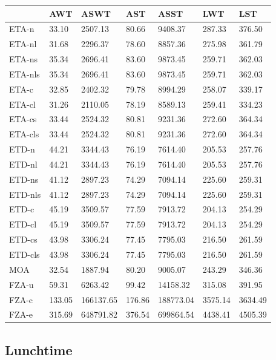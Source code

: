 \documentclass{UoYCSproject}
\begin{document}
\begin{tabular}{l | l l l l l l}
	& AWT & ASWT & AST & ASST & LWT & LST \\
	\hline
	ETA-n & 33.10 & 2507.13 & 80.66 & 9408.37 & 287.33 & 376.50 \\
	ETA-nl & 31.68 & 2296.37 & 78.60 & 8857.36 & 275.98 & 361.79 \\
	ETA-ns & 35.34 & 2696.41 & 83.60 & 9873.45 & 259.71 & 362.03 \\
	ETA-nls & 35.34 & 2696.41 & 83.60 & 9873.45 & 259.71 & 362.03 \\
	ETA-c & 32.85 & 2402.32 & 79.78 & 8994.29 & 258.07 & 339.17 \\
	ETA-cl & 31.26 & 2110.05 & 78.19 & 8589.13 & 259.41 & 334.23 \\
	ETA-cs & 33.44 & 2524.32 & 80.81 & 9231.36 & 272.60 & 364.34 \\
	ETA-cls & 33.44 & 2524.32 & 80.81 & 9231.36 & 272.60 & 364.34 \\
	\hline
	ETD-n & 44.21 & 3344.43 & 76.19 & 7614.40 & 205.53 & 257.76 \\
	ETD-nl & 44.21 & 3344.43 & 76.19 & 7614.40 & 205.53 & 257.76 \\
	ETD-ns & 41.12 & 2897.23 & 74.29 & 7094.14 & 225.60 & 259.31 \\
	ETD-nls & 41.12 & 2897.23 & 74.29 & 7094.14 & 225.60 & 259.31 \\
	ETD-c & 45.19 & 3509.57 & 77.59 & 7913.72 & 204.13 & 254.29 \\
	ETD-cl & 45.19 & 3509.57 & 77.59 & 7913.72 & 204.13 & 254.29 \\
	ETD-cs & 43.98 & 3306.24 & 77.45 & 7795.03 & 216.50 & 261.59 \\
	ETD-cls & 43.98 & 3306.24 & 77.45 & 7795.03 & 216.50 & 261.59 \\
	\hline
	MOA & 32.54 & 1887.94 & 80.20 & 9005.07 & 243.29 & 346.36 \\
	\hline
	FZA-u & 59.31 & 6263.42 & 99.42 & 14158.32 & 315.08 & 391.95 \\
	FZA-c & 133.05 & 166137.65 & 176.86 & 188773.04 & 3575.14 & 3634.49 \\
	FZA-e & 315.69 & 648791.82 & 376.54 & 699864.54 & 4438.41 & 4505.39
\end{tabular}

\subsection{Lunchtime}
\end{document}
